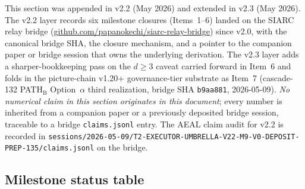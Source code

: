 \documentclass[11pt,a4paper]{article}
\theoremstyle{definition}
\theoremstyle{remark}
\begin{document}
This section was appended in v2.2 (May 2026) and extended in v2.3
(May 2026). The v2.2 layer records six milestone closures
(Items~1--6) landed on the SIARC relay bridge
(\href{https://github.com/papanokechi/siarc-relay-bridge}{github.com/papanokechi/siarc-relay-bridge})
since v2.0, with the canonical bridge SHA, the closure mechanism, and
a pointer to the companion paper or bridge session that owns the
underlying derivation. The v2.3 layer adds a sharper-bookkeeping
pass on the $d \geq 3$ caveat carried forward in Item~6 and folds in
the picture-chain v1.20+ governance-tier substrate as Item~7
(cascade-132 PATH$_{\mathrm{B}}$ Option~$\alpha$ third realization,
bridge SHA \texttt{b9aa881}, 2026-05-09). \emph{No numerical claim in this section
originates in this document}; every number is inherited from a
companion paper or a previously deposited bridge session, traceable
to a bridge \texttt{claims.jsonl} entry. The AEAL claim audit for
v2.2 is recorded in
\texttt{sessions/2026-05-09/T2-EXECUTOR-UMBRELLA-V22-M9-V0-DEPOSIT-PREP-135/claims.jsonl}
on the bridge.

\subsection{Milestone status table}
\label{sec:closure-cascade-table}
\end{document}
